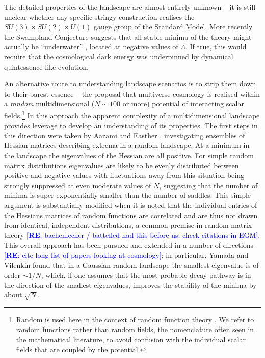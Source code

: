 \documentclass[12pt]{article}
\newcommand{\re}[1]{\textcolor{blue}{[{\bf RE}: #1]}}
\begin{document}
The detailed properties of the landscape are almost entirely unknown -- it is still unclear whether any specific stringy construction  realises  the $SU(3) \times SU(2) \times U(1)$ gauge group of the Standard Model.  More recently the Swampland Conjecture suggests that all stable minima of the theory might actually be ``underwater'' \cite{Agrawal2018},  located at negative values of $\Lambda$. If true, this would require that the cosmological dark energy was underpinned by dynamical quintessence-like evolution.   

An alternative route to understanding  landscape scenarios is to strip them down to their barest essence -- the proposal that multiverse cosmology is realised within a {\em random\/} multidimensional ($N\sim100$ or more) potential of interacting scalar fields.\footnote{Random is used here in the  context of random function theory \cite{GRF1, GRF2, GRF3}.  We refer to random functions rather than random fields, the nomenclature often seen in the mathematical literature, to avoid confusion with the individual scalar fields that are coupled by the potential.}  In this approach the apparent complexity of a multidimensional landscape  provides  leverage to develop an understanding of its properties. The first steps in this direction were taken by Aazami and Easther \cite{Aazami2006}, investigating ensembles of Hessian matrices describing extrema in a random landscape.  At  a minimum in the landscape the eigenvalues of the Hessian are all positive. For simple random matrix distributions eigenvalues are likely to be evenly distributed between positive and negative values with fluctuations away from this situation being strongly suppressed at even moderate values of $N$, suggesting that the number of minima is super-exponentially smaller than the number of saddles. This simple argument is substantially modified when it is noted that the individual entries of the Hessians matrices of random functions are correlated and are thus not drawn from identical, independent distributions, a common premise in random matrix theory \cite{Easther2016} \re{bachenlecher / battefled had this before us; check citations in EGM}. This overall approach has been pursued and extended in a number of directions \re{cite long list of papers looking at cosmology}; in particular, Yamada and Vilenkin found that in a Gaussian random landscape the smallest eigenvalue is of order $\sim 1/N$, which, if one assumes that the most probable decay pathway is in the direction of the smallest eigenvalues, improves the stability of the minima by about $\sqrt{N}$.\cite{Yamada2018} 
\end{document}

